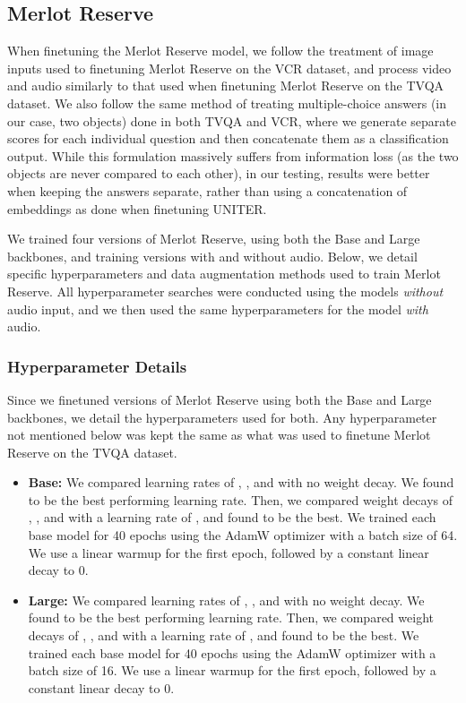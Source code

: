 \documentclass[runningheads]{llncs}
\begin{document}
\subsection{Merlot Reserve~\cite{zellers2022merlotreserve}}

When finetuning the Merlot Reserve model, we follow the treatment of image inputs used to finetuning Merlot Reserve on the VCR dataset, and process video and audio similarly to that used when finetuning Merlot Reserve on the TVQA dataset. We also follow the same method of treating multiple-choice answers (in our case, two objects) done in both TVQA and VCR, where we generate separate scores for each individual question and then concatenate them as a classification output. While this formulation massively suffers from information loss (as the two objects are never compared to each other), in our testing, results were better when keeping the answers separate, rather than using a concatenation of embeddings as done when finetuning UNITER.

We trained four versions of Merlot Reserve, using both the Base and Large backbones, and training versions with and without audio. Below, we detail specific hyperparameters and data augmentation methods used to train Merlot Reserve. All hyperparameter searches were conducted using the models \textit{without} audio input, and we then used the same hyperparameters for the model \textit{with} audio. 

\subsubsection{Hyperparameter Details} Since we finetuned versions of Merlot Reserve using both the Base and Large backbones, we detail the hyperparameters used for both. Any hyperparameter not mentioned below was kept the same as what was used to finetune Merlot Reserve on the TVQA dataset. 

\begin{itemize}
    \item \textbf{Base:} We compared learning rates of , , and  with no weight decay. We found  to be the best performing learning rate. Then, we compared weight decays of , , and  with a learning rate of , and found  to be the best. We trained each base model for 40 epochs using the AdamW optimizer with a batch size of 64. We use a linear warmup for the first epoch, followed by a constant linear decay to 0. 
    \item \textbf{Large:} We compared learning rates of , , and  with no weight decay. We found  to be the best performing learning rate. Then, we compared weight decays of , , and  with a learning rate of , and found  to be the best. We trained each base model for 40 epochs using the AdamW optimizer with a batch size of 16. We use a linear warmup for the first epoch, followed by a constant linear decay to 0. 
\end{itemize}
\end{document}
